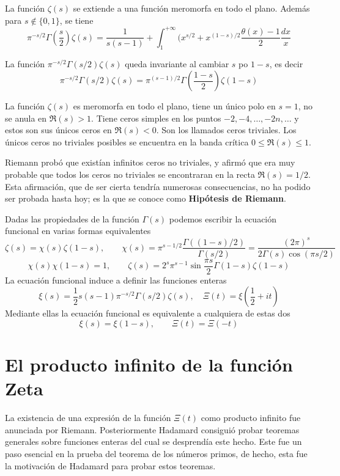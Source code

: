 \documentclass[TAN.tex]{subfiles}
\begin{document}
\begin{prop}
La función $ζ(s)$ se extiende a una función meromorfa en todo el plano.
Además para $s \notin \{0,1\}$, se tiene
\[ π^{-s/2} Γ\left(\frac{s}{2}\right) ζ(s) = \frac{1}{s(s-1)} + \int_1^{+∞} (x^{s/2}+x^{(1-s)/2}\frac{θ(x)-1}{2} \frac{dx}{x} \]
\end{prop}
\begin{teorema} La función $π^{-s/2} Γ(s/2) ζ(s)$ queda invariante al cambiar $s$ po $1-s$, es decir
\[ π^{-s/2} Γ(s/2) ζ(s) = π^{(s-1)/2} Γ\left(\frac{1-s}{2}\right) ζ(1-s) \]
\end{teorema}
\begin{coro}
La función $ζ(s)$ es meromorfa en todo el plano, tiene un único polo en $s = 1$, no se anula en $\Re(s) > 1$. Tiene ceros simples en los puntos $-2, -4, \dots, -2n, \dots$ y estos son sus únicos ceros en $\Re(s) < 0$. Son los llamados ceros triviales. Los únicos ceros no triviales posibles se encuentra en la banda crítica $0 ≤ \Re(s) ≤ 1$.
\end{coro}

Riemann probó que existían infinitos ceros no triviales, y afirmó que era muy probable que todos los ceros no triviales se encontraran en la recta $\Re(s)=1/2$. Esta afirmación, que de ser cierta tendría numerosas consecuencias, no ha podido ser probada hasta hoy; es la que se conoce como \textbf{Hipótesis de Riemann}.

Dadas las propiedades de la función $Γ(s)$ podemos escribir la ecuación funcional en varias formas equivalentes
\[ ζ(s) = χ(s)ζ(1-s), \qquad χ(s) = π^{s-1/2} \frac{Γ((1-s)/2)}{Γ(s/2)} = \frac{(2π)^s}{2Γ(s) \cos(πs/2)} \]
\[ χ(s)χ(1-s) = 1, \qquad ζ(s) = 2^sπ^{s-1} \sin \frac{πs}{2} Γ(1-s)ζ(1-s) \]
La ecuación funcional induce a definir las funciones enteras
\[ ξ(s) = \frac{1}{2} s(s-1)π^{-s/2}Γ(s/2) ζ(s), \quad Ξ(t)=ξ(\frac{1}{2}+it) \]
Mediante ellas la ecuación funcional es equivalente a cualquiera de estas dos
\[ ξ(s) = ξ(1-s), \qquad Ξ(t)=Ξ(-t) \]
\section{El producto infinito de la función Zeta}
La existencia de una expresión de la función $Ξ(t)$ como producto infinito fue anunciada por Riemann. Posteriormente Hadamard consiguió probar teoremas generales sobre funciones enteras del cual se desprendía este hecho. Este fue un paso esencial en la prueba del teorema de los números primos, de hecho, esta fue la motivación de Hadamard para probar estos teoremas.
\end{document}
